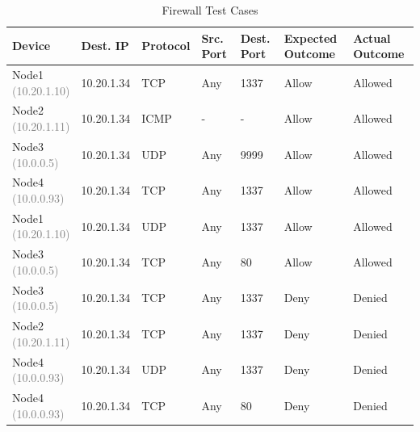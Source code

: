 \begin{table}[h]
    \centering
    \begin{tabular}{m{2.25cm}m{2cm}m{1.5cm}m{2cm}m{2cm}m{2cm}m{2cm}}
        \toprule
        Device & Dest. IP & Protocol & Src. Port & Dest. Port & Expected Outcome & Actual Outcome \\
        \midrule
        \parbox[c]{2.25cm}{\centering Node1\\\textcolor{gray}{(10.20.1.10)} \vspace*{14pt}} & 10.20.1.34 & TCP & Any & 1337 & Allow & Allowed \\
        \parbox[c]{2.25cm}{\centering Node2\\\textcolor{gray}{(10.20.1.11)} \vspace*{14pt}} & 10.20.1.34 & ICMP & - & - & Allow & Allowed \\
        \parbox[c]{2.25cm}{\centering Node3\\\textcolor{gray}{(10.0.0.5)} \vspace*{14pt}} & 10.20.1.34 & UDP & Any & 9999 & Allow & Allowed \\
        \parbox[c]{2.25cm}{\centering Node4\\\textcolor{gray}{(10.0.0.93)} \vspace*{14pt}} & 10.20.1.34 & TCP & Any & 1337 & Allow & Allowed \\
        \parbox[c]{2.25cm}{\centering Node1\\\textcolor{gray}{(10.20.1.10)} \vspace*{14pt}} & 10.20.1.34 & UDP & Any & 1337 & Allow & Allowed \\
        \parbox[c]{2.25cm}{\centering Node3\\\textcolor{gray}{(10.0.0.5)} \vspace*{14pt}} & 10.20.1.34 & TCP & Any & 80 & Allow & Allowed \\
        \parbox[c]{2.25cm}{\centering Node3\\\textcolor{gray}{(10.0.0.5)} \vspace*{14pt}} & 10.20.1.34 & TCP & Any & 1337 & Deny & Denied \\
        \parbox[c]{2.25cm}{\centering Node2\\\textcolor{gray}{(10.20.1.11)} \vspace*{14pt}} & 10.20.1.34 & TCP & Any & 1337 & Deny & Denied \\
        \parbox[c]{2.25cm}{\centering Node4\\\textcolor{gray}{(10.0.0.93)} \vspace*{14pt}} & 10.20.1.34 & UDP & Any & 1337 & Deny & Denied \\
        \parbox[c]{2.25cm}{\centering Node4\\\textcolor{gray}{(10.0.0.93)} \vspace*{14pt}} & 10.20.1.34 & TCP & Any & 80 & Deny & Denied \\
        \bottomrule
    \end{tabular}
    \caption{Firewall Test Cases}
    \label{tab:firewall_test_cases}
\end{table}


